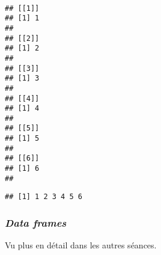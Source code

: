 \begin{knitrout}
\color{fgcolor}\begin{kframe}
\begin{flushleft}
\ttfamily\noindent
{}\hlassignement{\usebox{\hlnormalsizeboxlessthan}-}{\ }\hlkeyword{(}\hlkeyword{,}{\ }\hlkeyword{,}{\ }\hlkeyword{,}{\ }\hlkeyword{,}{\ }\hlkeyword{,}{\ }\hlkeyword{)}\hspace*{\fill}\\
\hlstd{}\mbox{}
\normalfont
\end{flushleft}
\begin{verbatim}
## [[1]]
## [1] 1
## 
## [[2]]
## [1] 2
## 
## [[3]]
## [1] 3
## 
## [[4]]
## [1] 4
## 
## [[5]]
## [1] 5
## 
## [[6]]
## [1] 6
## 
\end{verbatim}
\begin{flushleft}
\ttfamily\noindent
{}\hlkeyword{(}\hlkeyword{)}\mbox{}
\normalfont
\end{flushleft}
\begin{verbatim}
## [1] 1 2 3 4 5 6
\end{verbatim}
\end{kframe}
\end{knitrout}


\subsubsection{\emph{Data frames}}

Vu plus en détail dans les autres séances.
